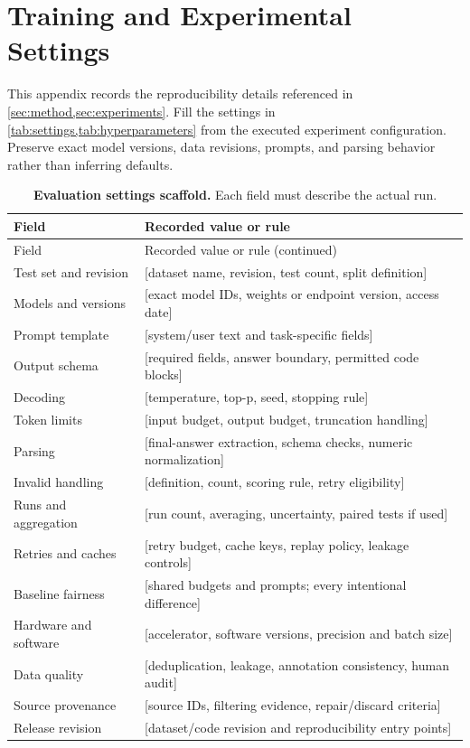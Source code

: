 \section{Training and Experimental Settings}
\label{app:settings}

This appendix records the reproducibility details referenced in \cref{sec:method,sec:experiments}. Fill the settings in \cref{tab:settings,tab:hyperparameters} from the executed experiment configuration. Preserve exact model versions, data revisions, prompts, and parsing behavior rather than inferring defaults.

\begin{longtable}{@{}p{}p{}@{}}
\caption{\textbf{Evaluation settings scaffold.} Each field must describe the actual run.}\label{tab:settings}\\
\toprule
Field & Recorded value or rule\\
\midrule
\endfirsthead
\toprule
Field & Recorded value or rule (continued)\\
\midrule
\endhead
Test set and revision & [dataset name, revision, test count, split definition]\\
Models and versions & [exact model IDs, weights or endpoint version, access date]\\
Prompt template & [system/user text and task-specific fields]\\
Output schema & [required fields, answer boundary, permitted code blocks]\\
Decoding & [temperature, top-p, seed, stopping rule]\\
Token limits & [input budget, output budget, truncation handling]\\
Parsing & [final-answer extraction, schema checks, numeric normalization]\\
Invalid handling & [definition, count, scoring rule, retry eligibility]\\
Runs and aggregation & [run count, averaging, uncertainty, paired tests if used]\\
Retries and caches & [retry budget, cache keys, replay policy, leakage controls]\\
Baseline fairness & [shared budgets and prompts; every intentional difference]\\
Hardware and software & [accelerator, software versions, precision and batch size]\\
Data quality & [deduplication, leakage, annotation consistency, human audit]\\
Source provenance & [source IDs, filtering evidence, repair/discard criteria]\\
Release revision & [dataset/code revision and reproducibility entry points]\\
\bottomrule
\end{longtable}

